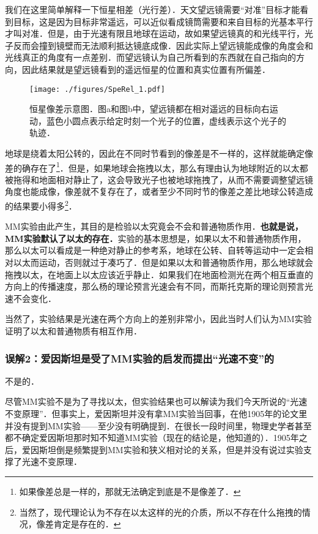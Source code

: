 我们在这里简单解释一下恒星相差（光行差）．天文望远镜需要“对准”目标才能看到目标，这是因为目标非常遥远，可以近似看成镜筒需要和来自目标的光基本平行才叫对准．但是，由于光速有限且地球在运动，故如果望远镜真的和光线平行，光子反而会撞到镜壁而无法顺利抵达镜底成像．因此实际上望远镜能成像的角度会和光线真正的角度有一点差别．而望远镜认为自己所看到的东西就在自己指向的方向，因此结果就是望远镜看到的遥远恒星的位置和真实位置有所偏差．

\begin{figure}[ht]
\centering
\texttt{[image: ./figures/SpeRel\_1.pdf]}
\caption{恒星像差示意图．图a和图b中，望远镜都在相对遥远的目标向右运动，蓝色小圆点表示给定时刻一个光子的位置，虚线表示这个光子的轨迹．} \label{SpeRel_fig1}
\end{figure}

地球是绕着太阳公转的，因此在不同时节看到的像差是不一样的，这样就能确定像差的确存在了\footnote{如果像差总是一样的，那就无法确定到底是不是像差了．}．但是，如果地球会拖拽以太，那么有理由认为地球附近的以太都被拖得和地面相对静止了，这会导致光子也被地球拖拽了，从而不需要调整望远镜角度也能成像，像差就不复存在了，或者至少不同时节的像差之差比地球公转造成的结果要小得多\footnote{当然了，现代理论认为不存在以太这样的光的介质，所以不存在什么拖拽的情况，像差肯定是存在的．}．



MM实验由此产生，其目的是检验以太究竟会不会和普通物质作用．\textbf{也就是说，MM实验默认了以太的存在．}实验的基本思想是，如果以太不和普通物质作用，那么以太可以看成是一种绝对静止的参考系，地球在公转、自转等运动中一定会相对以太而运动，否则就过于凑巧了．但是如果以太和普通物质作用，那么地球就会拖拽以太，在地面上以太应该近乎静止．如果我们在地面检测光在两个相互垂直的方向上的传播速度，那么杨的理论预言光速会有不同，而斯托克斯的理论则预言光速不会变化．

当然了，实验结果是光速在两个方向上的差别非常小，因此当时人们认为MM实验证明了以太和普通物质有相互作用．

\subsubsection{误解2：爱因斯坦是受了MM实验的启发而提出“光速不变”的}

不是的．

尽管MM实验不是为了寻找以太，但实验结果也可以解读为我们今天所说的“光速不变原理”．但事实上，爱因斯坦并没有拿MM实验当回事，在他1905年的论文里并没有提到MM实验——至少没有明确提到．在很长一段时间里，物理史学者甚至都不确定爱因斯坦那时知不知道MM实验（现在的结论是，他知道的）．1905年之后，爱因斯坦倒是频繁提到MM实验和狭义相对论的关系，但是并没有说过实验支撑了光速不变原理．


